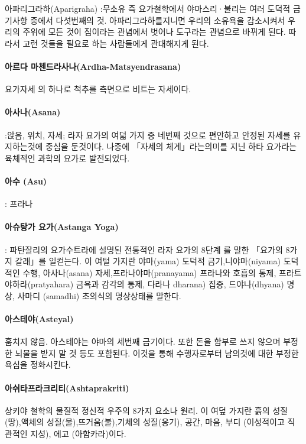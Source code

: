 \documentclass[12pt, a4paper, oneside]{book}
\begin{document}
아파리그라하(Aparigraha) :무소유 즉 요가철학에서 야마스리·불리는 여러 도덕적 금기사항 중에서 다섯번째의 것. 아파리그라하를지니면 우리의 소유욕을 감소시켜서 우리의 주위에 모든 것이 짐이라는 관념에서 벗어나 도구라는 관념으로 바뀌게 된다. 따라서 고런 것들을 필요로 하는 사람들에게 관대해지게 된다.

\paragraph{아르다 마첸드라사나(Ardha-Matsyendrasana)} 요가자세 의 하나로 척추를 측면으로 비트는 자세이다.

\paragraph{아사나(Asana)} :앉음, 위치, 자세; 라자 요가의 여덟 가지 중 네번째 것으로 편안하고 안정된 자세를 유지하는것에 중심을 둔것이다. 나중에 「자세의 체계」라는의미를 지닌 하타 요가라는 육체적인 과학의 요가로 발전되었다.

\paragraph{아수 (Asu)} : 프라나

\paragraph{아슈탕가 요가(Astanga Yoga)} :
파탄잘리의 요가수트라에 설명된 전통적인 라자 요가의 8단계 를 말한 「요가의 8가지 갈래」를 일컫는다. 이 여털 가지란 야마(yama) 도덕적 금기,니야마(niyama) 도덕적인 수행, 아사나(asana) 자세,프라나야마(pranayama) 프라나와 호흡의 통제, 프라트야하라(pratyahara) 금욕과 감각의 통제, 다라나 dharana) 집중, 드야나(dhyana) 명상, 사마디 (samadhi) 초의식의 명상상태를 말한다.

\paragraph{아스테야(Asteyal)}
훔치지 않음. 아스테야는 야마의 세번째 금기이다. 또한 돈을 함부로 쓰지 않으며 부정한 뇌물을 받지 말 것 등도 포함된다. 이것을 통해 수행자로부터 남의것에 대한 부정한 욕심을 정화시킨다.

\paragraph{아쉬타프라크리티(Ashtaprakriti)}
상키야 철학의 물질적 정신적 우주의 8가지 요소나 원리. 이 여덮 가지란 흙의 성질(땅),액체의 성질(물),뜨거움(불),기체의 성질(옹기), 공간, 마음, 부디 (이성적이고 직관적인 지성), 에고 (아함카라)이다.
\end{document}
